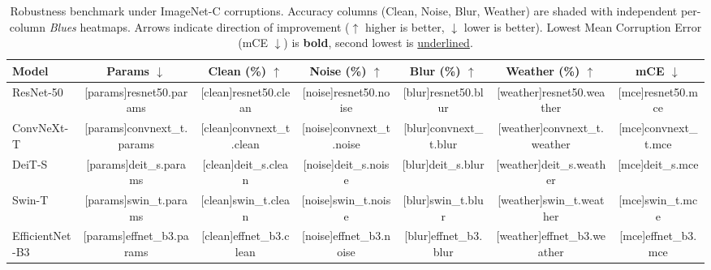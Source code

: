 \begin{table}[htbp]
\centering
\begin{threeparttable}
\caption{
Robustness benchmark under ImageNet-C corruptions.
Accuracy columns (Clean, Noise, Blur, Weather) are shaded with independent per-column \textit{Blues} heatmaps.
Arrows indicate direction of improvement ($\uparrow$ higher is better, $\downarrow$ lower is better).
Lowest Mean Corruption Error (mCE $\downarrow$) is \textbf{bold}, second lowest is \underline{underlined}.
}
\label{tab:robustness_heatmap}
\begin{tabular}{lcccccc}
\toprule
\textbf{Model} & \textbf{Params $\downarrow$} & \textbf{Clean (\%) $\uparrow$} & \textbf{Noise (\%) $\uparrow$} & \textbf{Blur (\%) $\uparrow$} & \textbf{Weather (\%) $\uparrow$} & \textbf{mCE $\downarrow$} \\
\midrule
ResNet-50       & [params]{resnet50.params}   & [clean]{resnet50.clean}   & [noise]{resnet50.noise}   & [blur]{resnet50.blur}   & [weather]{resnet50.weather}   & [mce]{resnet50.mce} \\
ConvNeXt-T      & [params]{convnext_t.params} & [clean]{convnext_t.clean} & [noise]{convnext_t.noise} & [blur]{convnext_t.blur} & [weather]{convnext_t.weather} & [mce]{convnext_t.mce} \\
DeiT-S          & [params]{deit_s.params}     & [clean]{deit_s.clean}     & [noise]{deit_s.noise}     & [blur]{deit_s.blur}     & [weather]{deit_s.weather}     & [mce]{deit_s.mce} \\
Swin-T          & [params]{swin_t.params}     & [clean]{swin_t.clean}     & [noise]{swin_t.noise}     & [blur]{swin_t.blur}     & [weather]{swin_t.weather}     & [mce]{swin_t.mce} \\
EfficientNet-B3 & [params]{effnet_b3.params}  & [clean]{effnet_b3.clean}  & [noise]{effnet_b3.noise}  & [blur]{effnet_b3.blur}  & [weather]{effnet_b3.weather}  & [mce]{effnet_b3.mce} \\
\bottomrule
\end{tabular}
\end{threeparttable}
\end{table}
